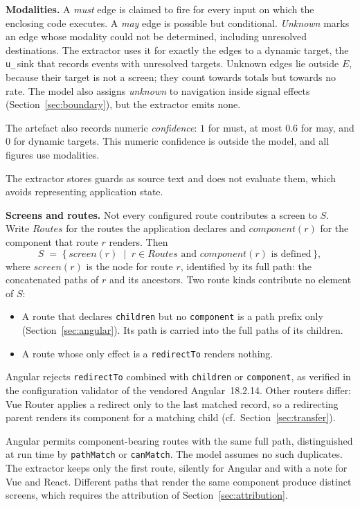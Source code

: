 \textbf{Modalities.} A \emph{must} edge is claimed to fire for every input on which the
enclosing code executes. A \emph{may} edge is possible but conditional. \emph{Unknown} marks an
edge whose modality could not be determined, including unresolved destinations. The
extractor uses it for exactly the edges to a dynamic target, the \texttt{u\_}\,sink that records
events with unresolved targets. Unknown edges lie outside $E$, because their target is not a screen; they count towards totals
but towards no rate. The model also assigns \emph{unknown} to navigation inside signal effects
(Section~\ref{sec:boundary}), but the extractor emits none.

The artefact also records numeric \emph{confidence}: $1$ for must, at most $0.6$ for may,
and $0$ for dynamic targets. This numeric confidence is outside the model, and all figures use modalities.

The extractor stores guards as source text and does not evaluate them, which avoids representing application state.

\textbf{Screens and routes.} Not every configured route contributes a screen to $S$. Write $\mathit{Routes}$ for the routes the application
declares and $\mathit{component}(r)$ for the component that route $r$ renders. Then
\[
  S \;=\; \{\, \mathit{screen}(r) \;\mid\; r \in \mathit{Routes}
  \text{ and } \mathit{component}(r) \text{ is defined} \,\},
\]
where $\mathit{screen}(r)$ is the node for route $r$, identified by its full path:
the concatenated paths of $r$ and its ancestors. Two route kinds contribute no element of
$S$:
\begin{itemize}
\item A route that declares \texttt{children} but no \texttt{component} is a path prefix only
(Section~\ref{sec:angular}). Its path is carried into the full paths of its children.
\item A route whose only effect is a \texttt{redirectTo} renders nothing.
\end{itemize}
Angular rejects \texttt{redirectTo} combined with \texttt{children} or \texttt{component},
as verified in the configuration validator of the vendored Angular~18.2.14. Other routers
differ: Vue Router applies a redirect only to the last matched record, so a redirecting
parent renders its component for a matching child (cf.~Section~\ref{sec:transfer}).

Angular permits component-bearing routes with the same full path, distinguished at run time
by \texttt{pathMatch} or \texttt{canMatch}. The model assumes no such duplicates. The extractor
keeps only the first route, silently for Angular and with a note for Vue and React.
Different paths that render the same component produce distinct
screens, which requires the attribution of Section~\ref{sec:attribution}.

